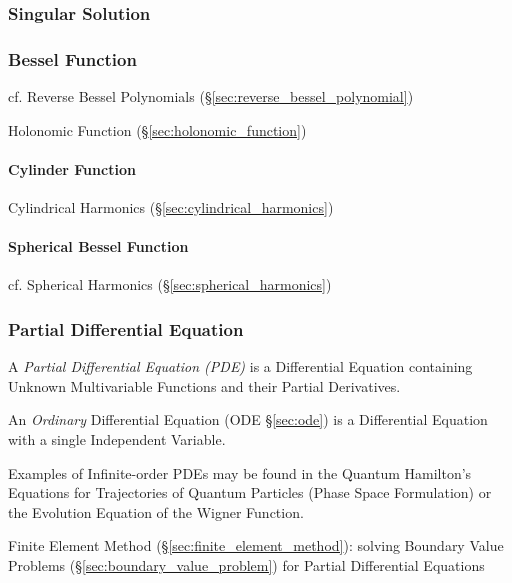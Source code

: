 \subsubsection{Singular Solution}\label{sec:singular_solution}

\subsubsection{Bessel Function}\label{sec:bessel_function}

cf. Reverse Bessel Polynomials (\S\ref{sec:reverse_bessel_polynomial})

\fist Holonomic Function (\S\ref{sec:holonomic_function})



\paragraph{Cylinder Function}\label{sec:cylinder_function}\hfill

\fist Cylindrical Harmonics (\S\ref{sec:cylindrical_harmonics})



\paragraph{Spherical Bessel Function}\label{sec:spherical_bessel}\hfill

\fist cf. Spherical Harmonics (\S\ref{sec:spherical_harmonics})



\subsubsection{Partial Differential Equation}\label{sec:pde}

A \emph{Partial Differential Equation (PDE)} is a Differential Equation
containing Unknown Multivariable Functions and their Partial Derivatives.

\fist An \emph{Ordinary} Differential Equation (ODE \S\ref{sec:ode}) is a
Differential Equation with a single Independent Variable.

Examples of Infinite-order PDEs may be found in the Quantum Hamilton's Equations
for Trajectories of Quantum Particles (Phase Space Formulation) or the Evolution
Equation of the Wigner Function.

Finite Element Method (\S\ref{sec:finite_element_method}): solving Boundary
Value Problems (\S\ref{sec:boundary_value_problem}) for Partial Differential
Equations

